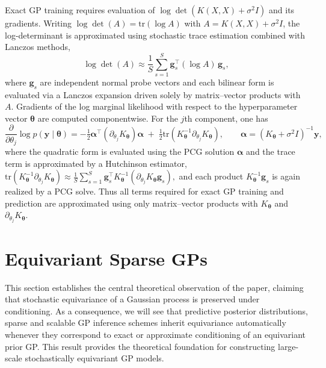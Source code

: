 \documentclass[11pt,a4paper]{article}
\newcommand{\by}{\boldsymbol{y}}
\newcommand{\btheta}{\boldsymbol{\theta}}
\begin{document}
Exact GP training requires evaluation of $\log\det(K(X,X)+\sigma^2 I)$ and its gradients.
Writing $\log\det(A)=\mathrm{tr}(\log A)$ with $A=K(X,X)+\sigma^2 I$, the log-determinant is approximated using stochastic trace estimation combined with Lanczos methods, \begin{displaymath}\log\det(A)\approx \frac{1}{S}\sum_{s=1}^S \boldsymbol{g}_s^\top (\log A)\, \boldsymbol{g}_s,\end{displaymath}
where $\boldsymbol{g}_s$ are independent normal probe vectors and each bilinear form is evaluated via a Lanczos expansion driven solely by
matrix--vector products with $A$.
Gradients of the log marginal likelihood with respect to the hyperparameter vector $\btheta$ are computed componentwise. For the $j$th component, one has
\begin{displaymath}\frac{\partial}{\partial \theta_j}\log p(\by\mid\btheta)=-\tfrac12 \boldsymbol{\alpha}^\top (\partial_{\theta_j} K_{\btheta})\boldsymbol{\alpha}\;+\;\tfrac12 \mathrm{tr}\!\left( K_{\btheta}^{-1}\partial_{\theta_j} K_{\btheta} \right), \qquad \boldsymbol{\alpha}=(K_{\btheta}+\sigma^2 I)^{-1}\by,\end{displaymath}
where the quadratic form is evaluated using the PCG solution $\boldsymbol{\alpha}$ and the trace term is approximated by a Hutchinson estimator, \begin{math}
    \mathrm{tr}(K_{\btheta}^{-1}\partial_{\theta_j} K_{\btheta})\approx
\frac{1}{S}\sum_{s=1}^S \boldsymbol{g}_s^\top K_{\btheta}^{-1}(\partial_{\theta_j} K_{\btheta} \boldsymbol{g}_s),
\end{math} and each product $K_{\btheta}^{-1}\boldsymbol{g}_s$ is again realized by a PCG solve. Thus all terms required for exact GP training and prediction are approximated using only matrix--vector products with $K_{\btheta}$ and $\partial_{\theta_j} K_{\btheta}$.


\section{Equivariant Sparse GPs}\label{sec:eq_gps}
This section establishes the central theoretical observation of the paper, claiming that stochastic equivariance of a Gaussian process is preserved under conditioning. As a consequence, we will see that predictive posterior distributions, sparse and scalable GP inference schemes inherit equivariance automatically whenever they correspond to exact or approximate conditioning of an equivariant prior GP. This result provides the theoretical foundation for constructing large-scale stochastically equivariant GP models. %
\end{document}
